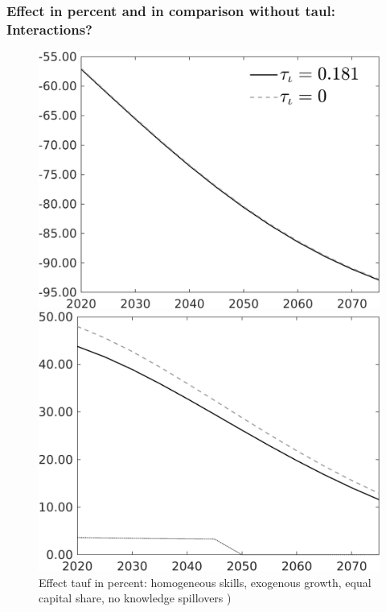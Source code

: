 \documentclass[12pt]{article}
\begin{document}
\subsubsection{Effect in percent and in comparison without taul: Interactions?}
\begin{figure}[h!!]
	\centering
	\caption{Effect tauf in percent: homogeneous skills, exogenous growth, equal capital share, no knowledge spillovers )}\label{fig:Leveltauf_nsk1_xgr1_equalcapShare_noknow_notaul}
	\begin{minipage}[]{0.32\textwidth}
		\includegraphics[width=1\textwidth]{../../codding_model/own_basedOnFried/optimalPol_010922_revision/figures/all_13Sept22/PerdifNoTauf_Equlab_regime0_CompTaul_Emnet_spillover0_nsk1_xgr1_knspil1_sep1_LFlimit0_emsbase0_countec0_GovRev0_etaa0.79_lgd1.png}
	\end{minipage}	
	\begin{minipage}[]{0.32\textwidth}
	\includegraphics[width=1\textwidth]{../../codding_model/own_basedOnFried/optimalPol_010922_revision/figures/all_13Sept22/CompTauf_bytaul_Equlab_Reg0_Emnet_spillover0_nsk1_xgr1_knspil1_sep1_LFlimit0_emsbase0_countec0_GovRev0_etaa0.79_lgd0.png}

\end{minipage}
\end{figure}
\end{document}
